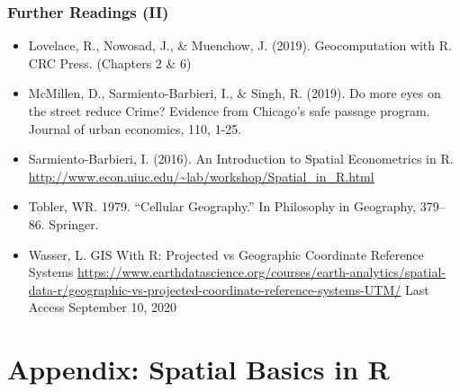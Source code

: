 \documentclass[
  shownotes,
  xcolor={svgnames},
  hyperref={colorlinks,citecolor=DarkBlue,linkcolor=DarkRed,urlcolor=DarkBlue}
   , aspectratio=169]{beamer}
\begin{document}
\begin{frame}
\frametitle{Further Readings (II)}
\scriptsize
\begin{itemize}

  \item Lovelace, R., Nowosad, J., \& Muenchow, J. (2019). Geocomputation with R. CRC Press. (Chapters 2 \& 6)
  \medskip
  \item McMillen, D., Sarmiento-Barbieri, I., \& Singh, R. (2019). Do more eyes on the street reduce Crime? Evidence from Chicago's safe passage program. Journal of urban economics, 110, 1-25.
  \medskip
  \item Sarmiento-Barbieri, I. (2016). An Introduction to Spatial Econometrics in R. \url{http://www.econ.uiuc.edu/~lab/workshop/Spatial_in_R.html}
  \medskip
  \item Tobler, WR. 1979. “Cellular Geography.” In Philosophy in Geography, 379–86. Springer.
  \medskip
  \item Wasser, L. GIS With R: Projected vs Geographic Coordinate Reference Systems \url{https://www.earthdatascience.org/courses/earth-analytics/spatial-data-r/geographic-vs-projected-coordinate-reference-systems-UTM/} Last Access September 10, 2020
\end{itemize}

\end{frame}


\section{Appendix: Spatial Basics in R}
\end{document}
